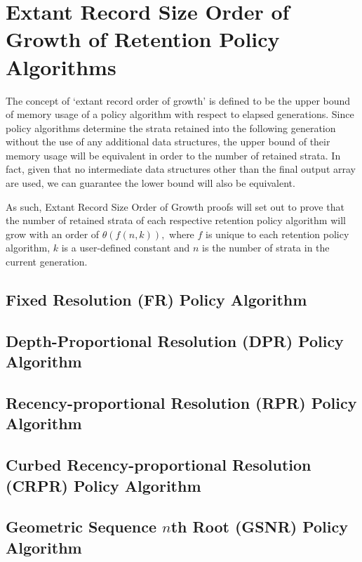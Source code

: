 \printunsrtglossary[numberedsection=autolabel]

\section{Extant Record Size Order of Growth of Retention Policy Algorithms} \label{sec:extant_record_oog}
The concept of `extant record order of growth' is defined to be the upper bound of memory usage of a policy algorithm with respect to elapsed generations.
Since policy algorithms determine the strata retained into the following generation without the use of any additional data structures, the upper bound of their memory usage will be equivalent in order to the number of retained strata.
In fact, given that no intermediate data structures other than the final output array are used, we can guarantee the lower bound will also be equivalent.

As such, Extant Record Size Order of Growth proofs will set out to prove that the number of retained strata of each respective retention policy algorithm will grow with an order of $\mathcal{\theta}(f(n, k)),$ where $f$ is unique to each retention policy algorithm, $k$ is a user-defined constant and $n$ is the number of strata in the current generation.

\subsection{Fixed Resolution (FR) Policy Algorithm}





\subsection{Depth-Proportional Resolution (DPR) Policy Algorithm}



\subsection{Recency-proportional Resolution (RPR) Policy Algorithm}

\subsection{Curbed Recency-proportional Resolution (CRPR) Policy Algorithm}

\subsection{Geometric Sequence $n$th Root (GSNR) Policy Algorithm}
